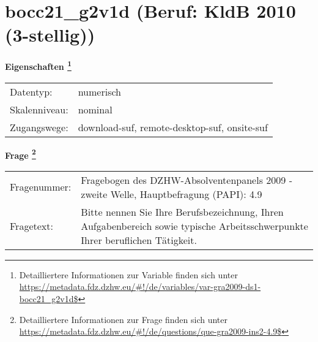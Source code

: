 
    \setcounter{footnote}{0}

    \vspace*{-1.8cm}
	\section{bocc21\_g2v1d (Beruf: KldB 2010 (3-stellig))}
	\label{section:bocc21_g2v1d}



    \vspace*{0.5cm}
    \noindent\textbf{Eigenschaften
	\footnote{Detailliertere Informationen zur Variable finden sich unter
		\url{https://metadata.fdz.dzhw.eu/\#!/de/variables/var-gra2009-ds1-bocc21_g2v1d$}}}\\
	\begin{tabularx}{\hsize}{@{}lX}
	Datentyp: & numerisch \\
	Skalenniveau: & nominal \\
	Zugangswege: &
	  download-suf, 
	  remote-desktop-suf, 
	  onsite-suf
 \\
    \end{tabularx}



				\vspace*{0.5cm}
                \noindent\textbf{Frage
	                \footnote{Detailliertere Informationen zur Frage finden sich unter
		              \url{https://metadata.fdz.dzhw.eu/\#!/de/questions/que-gra2009-ins2-4.9$}}}\\
				\begin{tabularx}{\hsize}{@{}lX}
					Fragenummer: &
					  Fragebogen des DZHW-Absolventenpanels 2009 - zweite Welle, Hauptbefragung (PAPI):
					  4.9
 \\
					Fragetext: & Bitte nennen Sie Ihre Berufsbezeichnung, Ihren Aufgabenbereich sowie typische Arbeitsschwerpunkte Ihrer beruflichen Tätigkeit. \\
				\end{tabularx}





